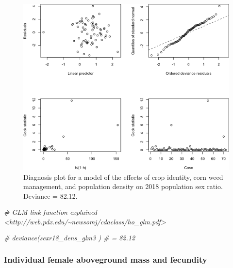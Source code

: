 \documentclass[
]{article}
\newenvironment{Shaded}{\begin{snugshade}}{\end{snugshade}}
\newcommand{\CommentTok}[1]{\textcolor[rgb]{0.56,0.35,0.01}{\textit{#1}}}
\begin{document}
\begin{figure}
\includegraphics[width=1\linewidth]{AppendixC_model_diagnosis_files/figure-latex/sexr18-dens-1} \caption{Diagnosis plot for a model of the effects of crop identity, corn weed management, and population density on 2018 population sex ratio. Deviance = 82.12.}\label{fig:sexr18-dens}
\end{figure}

\begin{Shaded}
\begin{Highlighting}[]
\CommentTok{\# GLM link function explained \textless{}http://web.pdx.edu/\textasciitilde{}newsomj/cdaclass/ho\_glm.pdf\textgreater{}}

\CommentTok{\# deviance(sexr18\_dens\_glm3 )  \# = 82.12}
\end{Highlighting}
\end{Shaded}

\hypertarget{individual-female-aboveground-mass-and-fecundity}{%
\subsubsection*{Individual female aboveground mass and fecundity}\label{individual-female-aboveground-mass-and-fecundity}}
\end{document}
